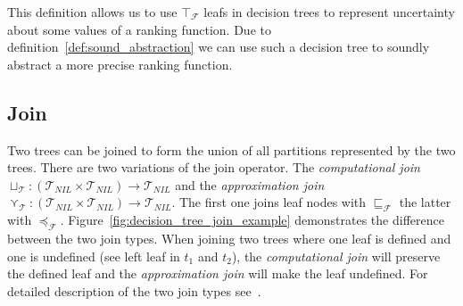 \documentclass[11pt,a4paper,titlepage]{article}
\begin{document}
This definition allows us to use $\top_\mathcal{F}$ leafs in decision trees to represent uncertainty about some values of a ranking function.
Due to definition~\ref{def:sound_abstraction} we can use such a decision tree to soundly abstract a more precise ranking function.


\subsection{Join}\label{sec:tree_join}
Two trees can be joined to form the union of all partitions represented by the two trees. There are two variations of the join operator. 
The \textit{computational join} $\sqcup_{\mathcal{T}} \colon (\mathcal{T}_{NIL} \times \mathcal{T}_{NIL}) \rightarrow \mathcal{T}_{NIL}$
and the \textit{approximation join} $\curlyvee_{\mathcal{T}} \colon (\mathcal{T}_{NIL} \times \mathcal{T}_{NIL}) \rightarrow \mathcal{T}_{NIL}$. 
The first one joins leaf nodes with $\sqsubseteq_{\mathcal{F}}$ the latter with $\preceq_{\mathcal{F}}$. Figure~\ref{fig:decision_tree_join_example} 
demonstrates the difference between the two join types. When joining two trees where one leaf is defined and one is undefined 
(see left leaf in $t_1$ and $t_2$), the \textit{computational join} will preserve the defined leaf
and the \textit{approximation join} will make the leaf undefined. For detailed description of the two join types see~\cite{UrbanPhd}.
\end{document}
